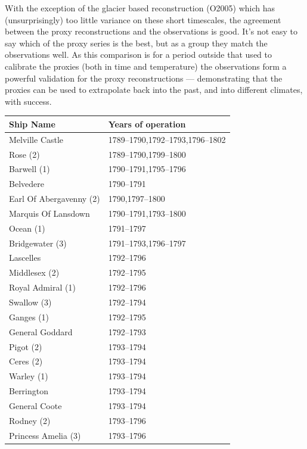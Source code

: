 \documentclass[CP]{copernicus}
\begin{document}
With the exception of the glacier based reconstruction (O2005) which has (unsurprisingly) too little variance on these short timescales, the agreement between the proxy reconstructions and the observations is good. It's not easy to say which of the proxy series is the best, but as a group they match the observations well. As this comparison is for a period outside that used to calibrate the proxies (both in time and temperature) the observations form a powerful validation for the proxy reconstructions --- demonstrating that the proxies can be used to extrapolate back into the past, and into different climates, with success.

\begin{table}[!hbp]
\begin{minipage}[b]{0.5\linewidth}\centering
{\scriptsize
\begin{tabular}{|p{3.5cm}|p{3.5cm}|}
\hline 
{\bf Ship Name} & {\bf Years of operation} \\ 
\hline
Melville Castle & 1789--1790,1792--1793,1796--1802\\
\hline
Rose (2) & 1789--1790,1799--1800\\
\hline
Barwell (1) & 1790--1791,1795--1796\\
\hline
Belvedere & 1790--1791\\
\hline
Earl Of Abergavenny (2) & 1790,1797--1800\\
\hline
Marquis Of Lansdown & 1790--1791,1793--1800\\
\hline
Ocean (1) & 1791--1797\\
\hline
Bridgewater (3) & 1791--1793,1796--1797\\
\hline
Lascelles & 1792--1796\\
\hline
Middlesex (2) & 1792--1795\\
\hline
Royal Admiral (1) & 1792--1796\\
\hline
Swallow (3) & 1792--1794\\
\hline
Ganges (1) & 1792--1795\\
\hline
General Goddard & 1792--1793\\
\hline
Pigot (2) & 1793--1794\\
\hline
Ceres (2) & 1793--1794\\
\hline
Warley (1) & 1793--1794\\
\hline
Berrington & 1793--1794\\
\hline
General Coote & 1793--1794\\
\hline
Rodney (2) & 1793--1796\\
\hline
Princess Amelia (3) & 1793--1796\\

\end{tabular}}
\end{minipage}
\end{table}
\end{document}
